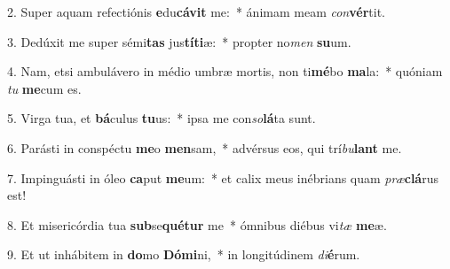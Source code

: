 2. Super aquam refectiónis \textbf{e}du\textbf{cá}\textbf{vit} me:~*  ánimam meam \textit{con}\textbf{vér}tit.\

3. Dedúxit me super sémi\textbf{tas} jus\textbf{tí}\textbf{ti}æ:~*  propter no\textit{men} \textbf{su}um.\

4. Nam, etsi ambulávero in médio umbræ mortis, non ti\textbf{mé}bo \textbf{ma}la:~*  quóniam \textit{tu} \textbf{me}cum es.\

5. Virga tua, et \textbf{bá}culus \textbf{tu}us:~*  ipsa me con\textit{so}\textbf{lá}ta sunt.\

6. Parásti in conspéctu \textbf{me}o \textbf{men}sam,~*  advérsus eos, qui trí\textit{bu}\textbf{lant} me.\

7. Impinguásti in óleo \textbf{ca}put \textbf{me}um:~*  et calix meus inébrians quam \textit{præ}\textbf{clá}rus est!\

8. Et misericórdia tua \textbf{sub}se\textbf{qué}\textbf{tur} me~*  ómnibus diébus vi\textit{tæ} \textbf{me}æ.\

9. Et ut inhábitem in \textbf{do}mo \textbf{Dó}\textbf{mi}ni,~*  in longitúdinem \textit{di}\textbf{é}rum.\

